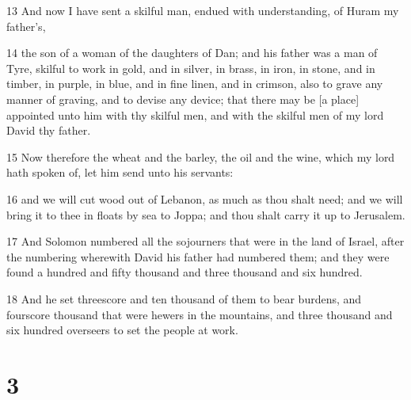 \par 13 And now I have sent a skilful man, endued with understanding, of Huram my father's,
\par 14 the son of a woman of the daughters of Dan; and his father was a man of Tyre, skilful to work in gold, and in silver, in brass, in iron, in stone, and in timber, in purple, in blue, and in fine linen, and in crimson, also to grave any manner of graving, and to devise any device; that there may be [a place] appointed unto him with thy skilful men, and with the skilful men of my lord David thy father.
\par 15 Now therefore the wheat and the barley, the oil and the wine, which my lord hath spoken of, let him send unto his servants:
\par 16 and we will cut wood out of Lebanon, as much as thou shalt need; and we will bring it to thee in floats by sea to Joppa; and thou shalt carry it up to Jerusalem.
\par 17 And Solomon numbered all the sojourners that were in the land of Israel, after the numbering wherewith David his father had numbered them; and they were found a hundred and fifty thousand and three thousand and six hundred.
\par 18 And he set threescore and ten thousand of them to bear burdens, and fourscore thousand that were hewers in the mountains, and three thousand and six hundred overseers to set the people at work.

\chapter{3}

